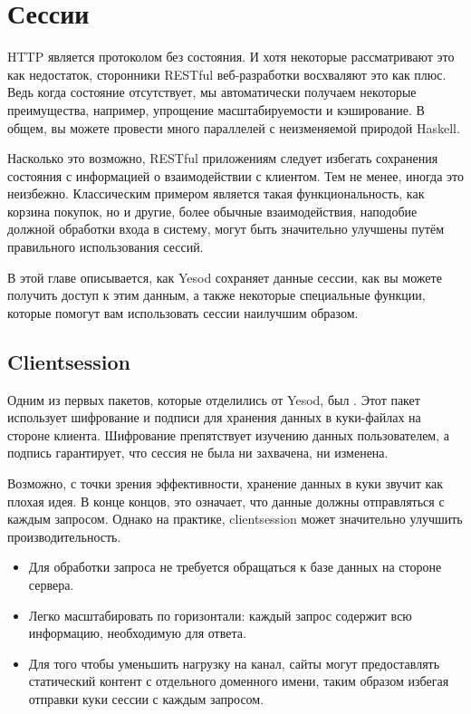 \chapter{Сессии}\label{chap:sessions}

HTTP является протоколом без состояния. И хотя некоторые рассматривают это как
недостаток, сторонники RESTful веб-разработки восхваляют это как плюс. Ведь
когда состояние отсутствует, мы автоматически получаем некоторые преимущества,
например, упрощение масштабируемости и кэширование.  В общем, вы можете
провести много параллелей с неизменяемой природой Haskell.

Насколько это возможно, RESTful приложениям следует избегать сохранения
состояния с информацией о взаимодействии с клиентом. Тем не менее, иногда это
неизбежно. Классическим примером является такая функциональность, как корзина
покупок, но и другие, более обычные взаимодействия, наподобие должной обработки
входа в систему, могут быть значительно улучшены путём правильного
использования сессий.

В этой главе описывается, как Yesod сохраняет данные сессии, как вы можете
получить доступ к этим данным, а также некоторые специальные функции, которые
помогут вам использовать сессии наилучшим образом.

\section{Clientsession}

Одним из первых пакетов, которые отделились от Yesod, был
.
Этот пакет использует шифрование и подписи для хранения данных в куки-файлах на
стороне клиента. Шифрование препятствует изучению данных пользователем, а
подпись гарантирует, что сессия не была ни захвачена, ни изменена.

Возможно, с точки зрения эффективности, хранение данных в куки звучит как
плохая идея. В конце концов, это означает, что данные должны отправляться с
каждым запросом. Однако на практике, clientsession может значительно улучшить
производительность.

\begin{itemize}
  \item Для обработки запроса не требуется обращаться к базе данных на стороне
      сервера.

  \item Легко масштабировать по горизонтали: каждый запрос содержит всю
      информацию, необходимую для ответа.

  \item Для того чтобы уменьшить нагрузку на канал, сайты могут предоставлять
      статический контент с отдельного доменного имени, таким образом избегая
      отправки куки сессии с каждым запросом.
\end{itemize}

